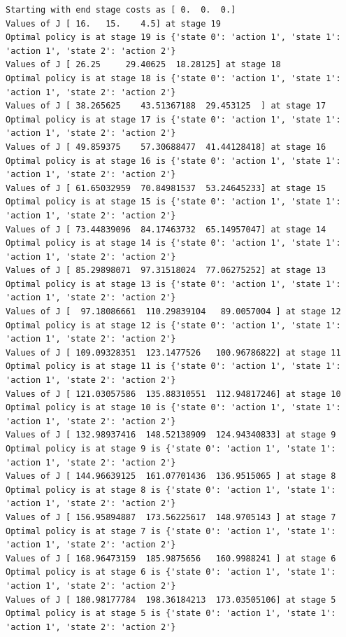 \begin{lstlisting}[numbers = none]
Starting with end stage costs as [ 0.  0.  0.]
Values of J [ 16.   15.    4.5] at stage 19
Optimal policy is at stage 19 is {'state 0': 'action 1', 'state 1': 'action 1', 'state 2': 'action 2'}
Values of J [ 26.25     29.40625  18.28125] at stage 18
Optimal policy is at stage 18 is {'state 0': 'action 1', 'state 1': 'action 1', 'state 2': 'action 2'}
Values of J [ 38.265625    43.51367188  29.453125  ] at stage 17
Optimal policy is at stage 17 is {'state 0': 'action 1', 'state 1': 'action 1', 'state 2': 'action 2'}
Values of J [ 49.859375    57.30688477  41.44128418] at stage 16
Optimal policy is at stage 16 is {'state 0': 'action 1', 'state 1': 'action 1', 'state 2': 'action 2'}
Values of J [ 61.65032959  70.84981537  53.24645233] at stage 15
Optimal policy is at stage 15 is {'state 0': 'action 1', 'state 1': 'action 1', 'state 2': 'action 2'}
Values of J [ 73.44839096  84.17463732  65.14957047] at stage 14
Optimal policy is at stage 14 is {'state 0': 'action 1', 'state 1': 'action 1', 'state 2': 'action 2'}
Values of J [ 85.29898071  97.31518024  77.06275252] at stage 13
Optimal policy is at stage 13 is {'state 0': 'action 1', 'state 1': 'action 1', 'state 2': 'action 2'}
Values of J [  97.18086661  110.29839104   89.0057004 ] at stage 12
Optimal policy is at stage 12 is {'state 0': 'action 1', 'state 1': 'action 1', 'state 2': 'action 2'}
Values of J [ 109.09328351  123.1477526   100.96786822] at stage 11
Optimal policy is at stage 11 is {'state 0': 'action 1', 'state 1': 'action 1', 'state 2': 'action 2'}
Values of J [ 121.03057586  135.88310551  112.94817246] at stage 10
Optimal policy is at stage 10 is {'state 0': 'action 1', 'state 1': 'action 1', 'state 2': 'action 2'}
Values of J [ 132.98937416  148.52138909  124.94340833] at stage 9
Optimal policy is at stage 9 is {'state 0': 'action 1', 'state 1': 'action 1', 'state 2': 'action 2'}
Values of J [ 144.96639125  161.07701436  136.9515065 ] at stage 8
Optimal policy is at stage 8 is {'state 0': 'action 1', 'state 1': 'action 1', 'state 2': 'action 2'}
Values of J [ 156.95894887  173.56225617  148.9705143 ] at stage 7
Optimal policy is at stage 7 is {'state 0': 'action 1', 'state 1': 'action 1', 'state 2': 'action 2'}
Values of J [ 168.96473159  185.9875656   160.9988241 ] at stage 6
Optimal policy is at stage 6 is {'state 0': 'action 1', 'state 1': 'action 1', 'state 2': 'action 2'}
Values of J [ 180.98177784  198.36184213  173.03505106] at stage 5
Optimal policy is at stage 5 is {'state 0': 'action 1', 'state 1': 'action 1', 'state 2': 'action 2'}

\end{lstlisting}
